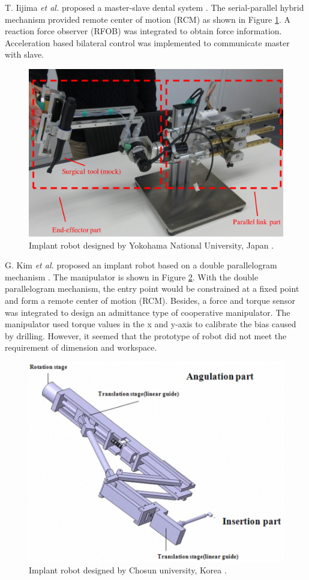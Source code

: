 \par
\vspace{-5mm}
T. Iijima \textit{et al.} proposed a master-slave dental system \cite{9026216}. The serial-parallel hybrid mechanism provided remote center of motion (RCM) as shown in Figure \ref{fig:japan}. A reaction force observer (RFOB) was integrated to obtain force information. Acceleration based bilateral control was implemented to communicate master with slave. 
\begin{figure}[htbp]
\begin{center}
\includegraphics[width=0.7\linewidth]{Images/Japan.png}
\caption[Implant robot designed by Yokohama National University, Japan]{
Implant robot designed by Yokohama National University, Japan \cite{9026216}.
}\label{fig:japan}
\end{center}
\end{figure}
\par
G. Kim \textit{et al.} proposed an implant robot based on a double parallelogram mechanism \cite{Kim2009ASO}. The manipulator is shown in Figure \ref{fig:korea}. With the double parallelogram mechanism, the entry point would be constrained at a fixed point and form a remote center of motion (RCM). Besides, a force and torque sensor was integrated to design an admittance type of cooperative manipulator. The manipulator used torque values in the x and y-axis to calibrate the bias caused by drilling. However, it seemed that the prototype of robot did not meet the requirement of dimension and workspace.
\begin{figure}[htbp]
\begin{center}
\includegraphics[width=0.7\linewidth]{Images/korea.png}
\caption[Implant robot designed by Chosun university, Korea]{
Implant robot designed by Chosun university, Korea \cite{Kim2009ASO}.
}\label{fig:korea}
\end{center}
\end{figure}
